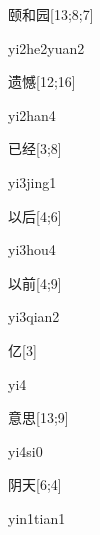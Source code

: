 \begin{verbete}[yi2he2yuan2]{颐和园}[13;8;7]
\begin{pronuncia}{yi2he2yuan2}
\end{pronuncia}
\end{verbete}

\begin{verbete}[yi2han4]{遗憾}[12;16]
\begin{pronuncia}{yi2han4}
\end{pronuncia}
\end{verbete}

\begin{verbete}[yi3jing1]{已经}[3;8]
\begin{pronuncia}{yi3jing1}
\end{pronuncia}
\end{verbete}

\begin{verbete}[yi3hou4]{以后}[4;6]
\begin{pronuncia}{yi3hou4}
\end{pronuncia}
\end{verbete}

\begin{verbete}[yi3qian2]{以前}[4;9]
\begin{pronuncia}{yi3qian2}
\end{pronuncia}
\end{verbete}

\begin{verbete}[yi4]{亿}[3]
\begin{pronuncia}{yi4}
\end{pronuncia}
\end{verbete}

\begin{verbete}[yi4si0]{意思}[13;9]
\begin{pronuncia}{yi4si0}
\end{pronuncia}
\end{verbete}

\begin{verbete}{阴天}[6;4]
\begin{pronuncia}{yin1tian1}
\end{pronuncia}
\end{verbete}

